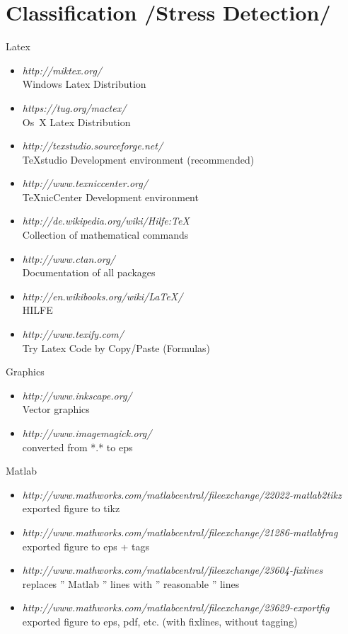 \section{Classification /Stress Detection/}
Latex
\begin{itemize}
	\item \emph{http://miktex.org/}   \\ Windows Latex Distribution
	\item \emph{https://tug.org/mactex/}   \\ Os~X Latex Distribution
	\item \emph{http://texstudio.sourceforge.net/}  \\ TeXstudio Development environment (recommended)
	\item \emph{http://www.texniccenter.org/}  \\ TeXnicCenter Development environment
	\item \emph{http://de.wikipedia.org/wiki/Hilfe:TeX}   \\ Collection of mathematical commands
	\item \emph{http://www.ctan.org/} \\ Documentation of all packages
	\item \emph{http://en.wikibooks.org/wiki/LaTeX/} \\ HILFE
	\item \emph{http://www.texify.com/}	\\ Try Latex Code by Copy/Paste (Formulas)
\end{itemize}
Graphics 
\begin{itemize}
	\item \emph{http://www.inkscape.org/}   \\ Vector graphics
	\item \emph{http://www.imagemagick.org/}  \\ converted from *.* to eps	
\end{itemize}
\clearpage
Matlab
\begin{itemize}
	\item \emph{http://www.mathworks.com/matlabcentral/fileexchange/22022-matlab2tikz} \\ exported figure to tikz
	\item \emph{http://www.mathworks.com/matlabcentral/fileexchange/21286-matlabfrag} \\ exported figure to eps + tags
	\item \emph{http://www.mathworks.com/matlabcentral/fileexchange/23604-fixlines} \\ replaces '' Matlab '' lines with '' reasonable '' lines
	\item \emph{http://www.mathworks.com/matlabcentral/fileexchange/23629-exportfig} \\ exported figure to eps, pdf, etc. (with fixlines, without tagging)
\end{itemize}
